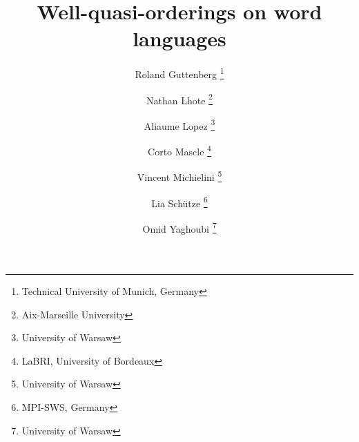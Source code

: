 %

\title{Well-quasi-orderings on word languages}
\author{%
        Roland Guttenberg
    \thanks{Technical University of Munich, Germany}
     \and
        Nathan Lhote
    \thanks{Aix-Marseille University}
     \and
        Aliaume Lopez
    \thanks{University of Warsaw}
     \and
        Corto Mascle
    \thanks{LaBRI, University of Bordeaux}
     \and
        Vincent Michielini
    \thanks{University of Warsaw}
     \and
        Lia Schütze
    \thanks{MPI-SWS, Germany}
     \and
        Omid Yaghoubi
    \thanks{University of Warsaw}
    }


\newcommand{\makeabstract}{
\begin{abstract}
    The set of finite words over a well-quasi-ordered set is itself
    well-quasi-ordered. This seminal result by Higman is a cornerstone
    of the theory of well-quasi-orderings and has found numerous
    applications in computer science. However, this result is based on a
    specific choice of ordering on words, the (scattered) subword
    ordering. In this paper, we describe to what extent other natural
    orderings (prefix, suffix, infix) on words can be used to derive
    Higman-like theorems. More specifically, we are interested in
    characterizing \emph{languages} of words that are well-quasi-ordered
    under these orderings. We show that a simple characterization is
    possible for the prefix and suffix orderings, and that under extra
    regularity assumptions, this also lifts to the infix ordering.
\end{abstract}
}
